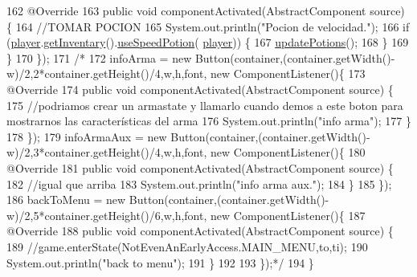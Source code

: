 \begin{DoxyCode}
162             @Override
163             \textcolor{keyword}{public} \textcolor{keywordtype}{void} componentActivated(AbstractComponent source) \{
164                 \textcolor{comment}{//TOMAR POCION}
165                 System.out.println(\textcolor{stringliteral}{"Pocion de velocidad."});
166                 \textcolor{keywordflow}{if} (\mbox{\hyperlink{classgui_1_1_inventary_g_u_i_ac788453bd94ba3fa6875e67fed92e1d7}{player}}.\mbox{\hyperlink{classentities_1_1_subject_a38fe8f9b3cc9f4c551163ae1f09f480b}{getInventary}}().\mbox{\hyperlink{classitems_1_1_inventary_ac1eb691e8eacc5e30ae323ed5517af89}{useSpeedPotion}}(
      \mbox{\hyperlink{classgui_1_1_inventary_g_u_i_ac788453bd94ba3fa6875e67fed92e1d7}{player}})) \{
167                     \mbox{\hyperlink{classgui_1_1_inventary_g_u_i_a0f9da0a1505dc29af480ff2c7e41e4d4}{updatePotions}}();
168                 \}
169             \}
170         \});
171         \textcolor{comment}{/*}
172 \textcolor{comment}{        infoArma = new Button(container,(container.getWidth()-w)/2,2*container.getHeight()/4,w,h,font, new
       ComponentListener()\{}
173 \textcolor{comment}{            @Override}
174 \textcolor{comment}{            public void componentActivated(AbstractComponent source) \{}
175 \textcolor{comment}{                //podriamos crear un armastate y llamarlo cuando demos a este boton para mostrarnos las
       características del arma}
176 \textcolor{comment}{               System.out.println("info arma");}
177 \textcolor{comment}{            \}}
178 \textcolor{comment}{        \});}
179 \textcolor{comment}{        infoArmaAux = new Button(container,(container.getWidth()-w)/2,3*container.getHeight()/4,w,h,font,
       new ComponentListener()\{}
180 \textcolor{comment}{            @Override}
181 \textcolor{comment}{            public void componentActivated(AbstractComponent source) \{}
182 \textcolor{comment}{                //igual que arriba}
183 \textcolor{comment}{                System.out.println("info arma aux.");}
184 \textcolor{comment}{            \}}
185 \textcolor{comment}{        \});}
186 \textcolor{comment}{        backToMenu = new Button(container,(container.getWidth()-w)/2,5*container.getHeight()/6,w,h,font,
       new ComponentListener()\{}
187 \textcolor{comment}{            @Override}
188 \textcolor{comment}{            public void componentActivated(AbstractComponent source) \{}
189 \textcolor{comment}{                //game.enterState(NotEvenAnEarlyAccess.MAIN\_MENU,to,ti);}
190 \textcolor{comment}{                System.out.println("back to menu");}
191 \textcolor{comment}{            \}}
192 \textcolor{comment}{        }
193 \textcolor{comment}{        \});*/}
194     \}
\end{DoxyCode}
\mbox{\label{classgui_1_1_inventary_g_u_i_ae5a22f3e705e5b36f844789ad23daeaa}} 
